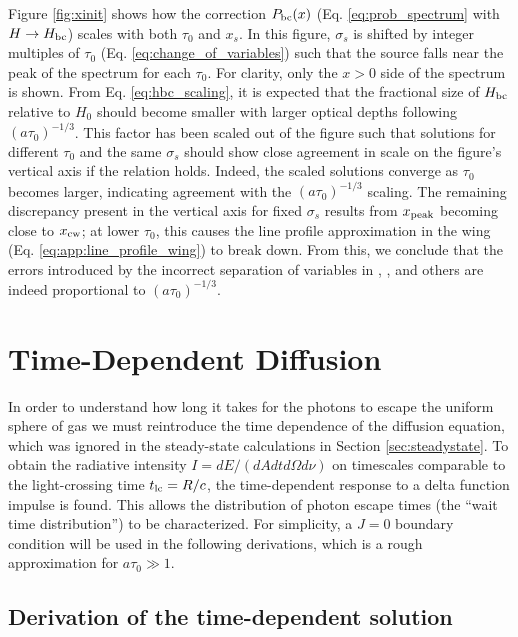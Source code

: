 \documentclass[linenumbers]{aastex63}
\begin{document}
Figure \ref{fig:xinit} shows how the correction $P_{\rm bc}(x)$ (Eq. \ref{eq:prob_spectrum} with $H \rightarrow H_{\rm bc}$) scales with both $\tau_0$ and $x_s$. In this figure, $\sigma_s$ is shifted by integer multiples of $\tau_0$ (Eq. \ref{eq:change_of_variables}) such that the source falls near the peak of the spectrum for each $\tau_0$. For clarity, only the $x > 0$ side of the spectrum is shown. From Eq. \ref{eq:hbc_scaling}, it is expected that the fractional size of $H_{\rm bc}$ relative to $H_0$ should become smaller with larger optical depths following $(a\tau_0)^{-1/3}$. This factor has been scaled out of the figure such that solutions for different $\tau_0$ and the same $\sigma_s$ should show close agreement in scale on the figure's vertical axis if the relation holds. Indeed, the scaled solutions converge as $\tau_0$ becomes larger, indicating agreement with the $(a\tau_0)^{-1/3}$ scaling. The remaining discrepancy present in the vertical axis for fixed $\sigma_s$ results from $x_{\rm peak}$ becoming close to $x_{\rm cw}$; at lower $\tau_0$, this causes the line profile approximation in the wing (Eq. \ref{eq:app:line_profile_wing}) to break down. From this, we conclude that the errors introduced by the incorrect separation of variables in \cite{1973MNRAS.162...43H}, \cite{1990ApJ...350..216N}, \cite{2006ApJ...649...14D} and others are indeed proportional to $(a\tau_0)^{-1/3}$.

\section{Time-Dependent Diffusion}
\label{sec:time_dependent}

In order to understand how long it takes for the photons to escape the uniform sphere of gas we must reintroduce the time dependence of the diffusion equation, which was ignored in the steady-state calculations in Section \ref{sec:steadystate}. To obtain the radiative intensity $I=dE/(dAdtd\Omega d\nu)$ on timescales comparable to the light-crossing time $t_{\rm lc} = R/c$, the time-dependent response to a delta function impulse is found. This allows the distribution of photon escape times (the ``wait time distribution'') to be characterized. For simplicity, a $J=0$ boundary condition will be used in the following derivations, which is a rough approximation for $a\tau_0 \gg 1$. 

\subsection{Derivation of the time-dependent solution}
\label{subsec:time_dependent:background}
\end{document}
